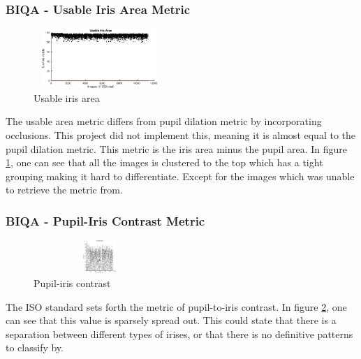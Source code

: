 \subsubsection{BIQA - Usable Iris Area Metric}\vspace{-5mm}
	\begin{figure}
		\centering
		\includegraphics[height=2.25cm, width=5cm]{pics/biqa_dist_uia}
		\caption{Usable iris area \cite{iso}}
		\label{fig:uia}
	\end{figure}
The usable area metric differs from pupil dilation metric by incorporating
occlusions. This project did not implement this, meaning it is almost equal to
the pupil dilation metric.  This metric is the iris area minus the pupil area.
In figure \ref{fig:uia}, one can see that all the images is clustered to the top
which has a tight grouping making it hard to differentiate. Except for the
images which was unable to retrieve the metric from.


\vspace{-5mm}
\subsubsection{BIQA - Pupil-Iris Contrast Metric}\vspace{-5mm}
	\begin{figure}
		\centering
		\includegraphics[height=1.25cm, width=5cm]{pics/biqa_dist_ipc}
		\caption{Pupil-iris contrast \cite{iso}}
		\label{fig:ipc}
	\end{figure}
The ISO standard sets forth the metric of pupil-to-iris contrast. In figure
\ref{fig:ipc}, one can see that this value is sparsely spread out. This could
state that there is a separation between different types of irises, or that
there is no definitive patterns to classify by.


\vspace{-5mm}
